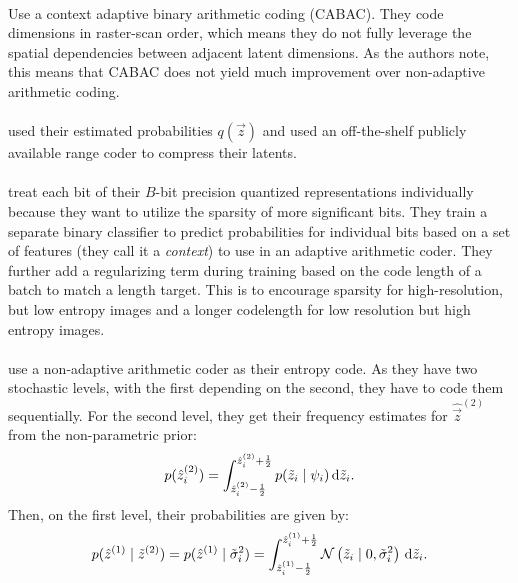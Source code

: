 \paragraph{\cite{balle2016end}} Use a context adaptive binary arithmetic coding (CABAC).
  They code dimensions in raster-scan order, which means they do not fully leverage the
  spatial dependencies between adjacent latent dimensions.
  As the authors note, this means that CABAC does not yield much improvement
  over non-adaptive arithmetic coding. 

\paragraph{\cite{theis2017lossy}} used their estimated probabilities $q(\vec{z})$ and
  used an off-the-shelf publicly available range coder to compress their latents.

\paragraph{\cite{rippel2017real}} treat each bit of their $B$-bit precision quantized
  representations individually because they want to utilize the sparsity of
  more significant bits. They train a separate binary classifier to predict
  probabilities for individual bits based on a set of features (they call
  it a \textit{context}) to use in an adaptive arithmetic coder. They further
  add a regularizing term during training based on the code length of a batch to
  match a length target. This is to encourage sparsity for high-resolution, but
  low entropy images and a longer codelength for low resolution but high entropy
  images.

\paragraph{\cite{balle2018variational}} use a non-adaptive arithmetic coder as their
  entropy code. As they have two stochastic levels, with the
  first depending on the second, they have to code them sequentially. For the
  second level, they get their frequency estimates for $\hat{\vec{z}}^{(2)}$
  from the non-parametric prior:
  \[
    p(\hat{z}^{(2)}_i) =
    \int_{\hat{z}^{(2)}_i-\frac{1}{2}}^{\hat{z}^{(2)}_i+\frac{1}{2}}p(\tilde{z}_i \mid \psi_i) \,\text{d} \tilde{z}_i.
  \]
  Then, on the first level, their probabilities are given by:
  \[
    p(\hat{z}^{(1)} \mid \tilde{z}^{(2)}) = p(\hat{z}^{(1)} \mid
    \tilde{\sigma}^2_i) = 
    \int_{\hat{z}^{(1)}_i-\frac{1}{2}}^{\hat{z}^{(1)}_i + \frac{1}{2}}\mathcal{N}\left( \tilde{z}_i \mid 0, \tilde{\sigma}^2_i \right) \,\text{d} \tilde{z}_i.
  \]

